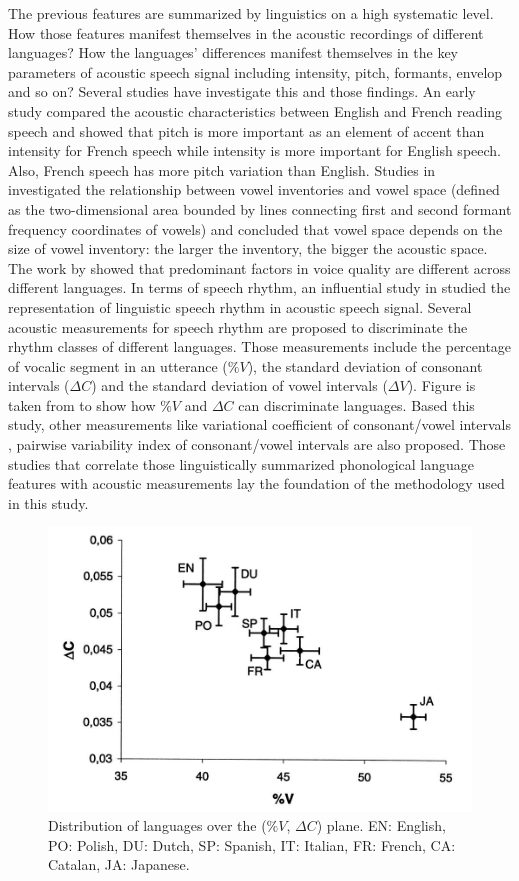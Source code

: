 The previous features are summarized by linguistics on a high systematic level. How those features manifest themselves in the acoustic recordings of different languages? How the languages' differences manifest themselves in the key parameters of acoustic speech signal including intensity, pitch, formants, envelop and so on? Several studies have investigate this and those findings. An early study \citep{parmenter1933experimental} compared the acoustic characteristics between English and French reading speech and showed that pitch is more important as an element of accent than intensity for French speech while intensity is more important for English speech. Also, French speech has more pitch variation than English. Studies in \citep{jongman1989acoustic,bradlow1995comparative,al2005does} investigated the relationship between vowel inventories and vowel space (defined as the two-dimensional area bounded by lines connecting first and second formant frequency coordinates of vowels) and concluded that vowel space depends on the size of vowel inventory: the larger the inventory, the bigger the acoustic space. The work by \citep{wagner2003voice} showed that predominant factors in voice quality are different across different languages. In terms of speech rhythm, an influential study in \citep{ramus1999correlates} studied the representation of linguistic speech rhythm in acoustic speech signal. Several acoustic measurements for speech rhythm are proposed to discriminate the rhythm classes of different languages. Those measurements include the percentage of vocalic segment in an utterance ($\%V$), the standard deviation of consonant intervals ($\Delta C$) and the standard deviation of vowel intervals ($\Delta V$). Figure is taken from \citep{ramus1999correlates} to show how $\%V$ and $\Delta C$ can discriminate languages. Based this study, other measurements like variational coefficient of consonant/vowel intervals \citep{dellwo2006rhythm}, pairwise variability index of consonant/vowel intervals \citep{grabe2002durational} are also proposed. Those studies that correlate those linguistically summarized phonological language features with acoustic measurements lay the foundation of the methodology used in this study.

\begin{figure}[h]
\centering
\captionsetup{justification=centering}
\includegraphics[width = 0.8\linewidth]{figures/ramus_paper.JPG}
\caption{Distribution of languages over the ($\%V$, $\Delta C$) plane. EN: English, PO: Polish, DU: Dutch, SP: Spanish, IT: Italian, FR: French, CA: Catalan, JA: Japanese.}
\label{fig:wals_example}
\end{figure}
